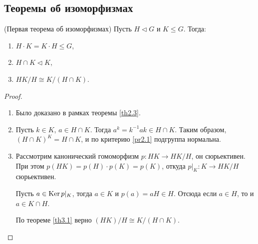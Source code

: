 \subsection{Теоремы об изоморфизмах}

\begin{theorem}(Первая теорема об изоморфизмах)
    Пусть $H \vartriangleleft G$ и $K \leq G$. Тогда:
    \begin{enumerate}
        \item $H \cdot K = K \cdot H \leq G$,
        \item $H \cap K \vartriangleleft K$,
        \item $HK/H \cong K/(H \cap K)$.
    \end{enumerate}
\end{theorem}

\begin{proof}~
    \begin{enumerate}
        \item Было доказано в рамках теоремы \ref{th2.3}.
        \item Пусть $k \in K$, $a \in H \cap K$. Тогда $a^{k} = k^{-1} a k \in H \cap K$.
        Таким образом, $(H \cap K)^K = H \cap K$, и по критерию \ref{pr2.1} подгруппа нормальна.
        \item Рассмотрим канонический гомоморфизм $p: HK \to HK/H$, он сюрьективен.
        При этом $p(HK)= p(H) \cdot p(K) = p(K)$, откуда $p \vert_{K}: K \to HK/H$ сюрьективен.

        Пусть $a \in \operatorname{Ker} p \vert_{K}$, тогда $a \in K$ и $p(a) = aH \in H$. Отсюда если $a \in H$,
        то и $a \in K \cap H$.

        По теореме \ref{th3.1} верно $(HK)/H \cong K/(H \cap K)$.
    \end{enumerate}
\end{proof}

